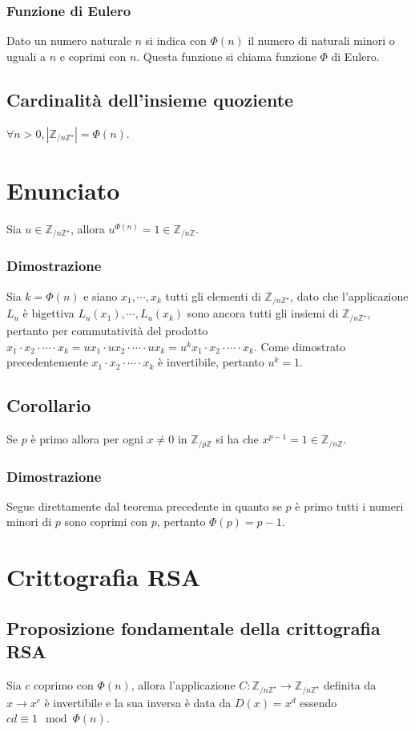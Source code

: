 \subsubsection{Funzione di Eulero}
Dato un numero naturale $n$ si indica con $\Phi(n)$ il numero di naturali minori o uguali a $n$ e coprimi con $n$. Questa funzione si chiama funzione $\Phi$ di Eulero.
\subsection{Cardinalit\`a dell'insieme quoziente}
$\forall n>0, |\mathbb{Z}_{/n\mathbb{Z}^\star}|=\Phi(n)$.
\section{Enunciato}
Sia $u\in\mathbb{Z}_{/n\mathbb{Z}^\star}$, allora $u^{\Phi(n)}=1\in\mathbb{Z}_{/n\mathbb{Z}}$.
\subsubsection{Dimostrazione}
Sia $k=\Phi(n)$ e siano $x_1,\cdots, x_k$ tutti gli elementi di $\mathbb{Z}_{/n\mathbb{Z}^\star}$, dato che l'applicazione $L_u$ \`e bigettiva $L_u(x_1),\cdots, L_u(x_k)$ sono 
ancora tutti gli insiemi di $\mathbb{Z}_{/n\mathbb{Z}^\star}$, pertanto per commutativit\`a del prodotto $x_1\cdot x_2\cdot\cdots\cdot x_k=ux_1\cdot ux_2\cdot\cdots\cdot ux_k=
u^kx_1\cdot x_2\cdot\cdots\cdot x_k$. Come dimostrato precedentemente $x_1\cdot x_2\cdot\cdots\cdot x_k$ \`e invertibile, pertanto $u^k=1$.
\subsection{Corollario}
Se $p$ \`e primo allora per ogni $x\neq 0$ in $\mathbb{Z}_{/p\mathbb{Z}}$ si ha che $x^{p-1}=1\in\mathbb{Z}_{/n\mathbb{Z}}$.
\subsubsection{Dimostrazione}
Segue direttamente dal teorema precedente in quanto se $p$ \`e primo tutti i numeri minori di $p$ sono coprimi con $p$, pertanto $\Phi(p)=p-1$.
\section{Crittografia RSA}
\subsection{Proposizione fondamentale della crittografia RSA}
Sia $c$ coprimo con $\Phi(n)$, allora l'applicazione $C:\mathbb{Z}_{/n\mathbb{Z}^\star}\rightarrow\mathbb{Z}_{/n\mathbb{Z}^\star}$ definita da $x\rightarrow x^c$ \`e 
invertibile e la sua inversa \`e data da $D(x)=x^d$ essendo $cd\equiv 1\mod \Phi(n)$.
